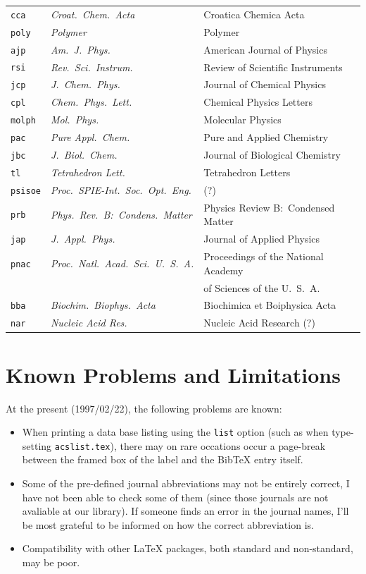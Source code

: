 \documentclass{article}
\begin{document}
\begin{tabular}{|lll|}
\texttt{cca} & \textit{Croat.\ Chem.\ Acta} & Croatica Chemica Acta \\ 
\texttt{poly} & \textit{Polymer} & Polymer \\ 
\texttt{ajp} & \textit{Am.\ J.\ Phys.} & American Journal of Physics \\ 
\texttt{rsi} & \textit{Rev.\ Sci.\ Instrum.} & Review of Scientific
Instruments \\ 
\texttt{jcp} & \textit{J.~Chem.\ Phys.} & Journal of Chemical Physics \\ 
\texttt{cpl} & \textit{Chem.\ Phys.\ Lett.} & Chemical Physics Letters \\ 
\texttt{molph} & \textit{Mol.\ Phys.} & Molecular Physics \\ 
\texttt{pac} & \textit{Pure Appl.\ Chem.} & Pure and Applied Chemistry \\ 
\texttt{jbc} & \textit{J.~Biol.\ Chem.} & Journal of Biological Chemistry \\ 
\texttt{tl} & \textit{Tetrahedron Lett.} & Tetrahedron Letters \\ 
\texttt{psisoe} & \textit{Proc.\ SPIE-Int.\ Soc.\ Opt.\ Eng.} & (?) \\ 
\texttt{prb} & \textit{Phys.\ Rev.\ B:\ Condens.\ Matter} & Physics Review
B:\ Condensed Matter \\ 
\texttt{jap} & \textit{J.~Appl.\ Phys.} & Journal of Applied Physics \\ 
\texttt{pnac} & \textit{Proc.\ Natl.\ Acad.\ Sci.\ U.~S.~A.} & Proceedings
of the National Academy \\ 
&  & \hfill of Sciences of the U.~S.~A. \\ 
\texttt{bba} & \textit{Biochim.\ Biophys.\ Acta} & Biochimica et Boiphysica
Acta \\ 
\texttt{nar} & \textit{Nucleic Acid Res.} & Nucleic Acid Research (?) \\ 
\hline
\end{tabular}
\newpage

\section{Known Problems and Limitations}

At the present (1997/02/22), the following problems are known:

\begin{itemize}
\item When printing a data base listing using the \texttt{list} option (such
as when type-setting \texttt{acslist.tex}), there may on rare occations
occur a page-break between the framed box of the label and the BibTeX entry
itself.

\item Some of the pre-defined journal abbreviations may not be entirely
correct, I have not been able to check some of them (since those journals
are not avaliable at our library). If someone finds an error in the journal
names, I'll be most grateful to be informed on how the correct abbreviation
is.

\item Compatibility with other LaTeX packages, both standard and
non-standard, may be poor.
\end{itemize}
\end{document}
